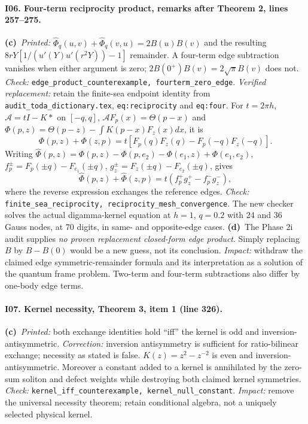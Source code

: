 \documentclass[11pt,a4paper]{article}
\newcommand{\C}{\textbf{(c)}\ }
\newcommand{\D}{\textbf{(d)}\ }
\newcommand{\file}[1]{\nolinkurl{#1}}
\newcommand{\test}[1]{\textit{Check:} \file{#1}.}
\begin{document}
\paragraph{I06. Four-term reciprocity product, remarks after Theorem 2, lines 257--275.}
\C \textit{Printed:}
$\widehat\Phi_q(u,v)+\widehat\Phi_q(v,u)=2B(u)B(v)$ and the resulting
$8rY[1/(u'(Y)u'(r^2Y))-1]$ remainder. A four-term edge subtraction
vanishes when either argument is zero; $2B(0^+)B(v)=2\sqrt\pi B(v)$
does not. \test{edge_product_counterexample, fourterm_zero_edge}
\textit{Verified replacement:} retain the finite-sea endpoint identity
from \file{audit_toda_dictionary.tex}, \file{eq:reciprocity} and \file{eq:four}.
For $t=2\pi h$, $\mathcal A=tI-K*$ on $[-q,q]$,
$\mathcal AF_p(x)=\Theta(p-x)$ and
$\Phi(p,z)=\Theta(p-z)-\int K(p-x)F_z(x)dx$, it is
\[
 \Phi(p,z)+\Phi(z,p)=t[F_p(q)F_z(q)-F_p(-q)F_z(-q)].
\]
Writing $\widehat\Phi(p,z)=\Phi(p,z)-\Phi(p,e_2)-\Phi(e_1,z)+\Phi(e_1,e_2)$,
$f_p^\pm=F_p(\pm q)-F_{e_1}(\pm q)$,
$g_z^\pm=F_z(\pm q)-F_{e_2}(\pm q)$, gives
\[
 \widehat\Phi(p,z)+\widehat\Phi(z,p)=t(f_p^+g_z^+-f_p^-g_z^-),
\]
where the reverse expression exchanges the reference edges.
\test{finite_sea_reciprocity, reciprocity_mesh_convergence}
The new checker solves the actual digamma-kernel equation at $h=1$, $q=0.2$
with 24 and 36 Gauss nodes, at 70 digits, in same- and opposite-edge cases.
\D The Phase 2i audit supplies \emph{no proven replacement closed-form edge
product}. Simply replacing $B$ by $B-B(0)$ would be a new guess, not its
conclusion. \textit{Impact:} withdraw the claimed edge symmetric-remainder
formula and its interpretation as a solution of the quantum frame problem.
Two-term and four-term subtractions also differ by one-body edge terms.

\paragraph{I07. Kernel necessity, Theorem 3, item 1 (line 326).}
\C \textit{Printed:} both exchange identities hold ``iff'' the kernel is
odd and inversion-antisymmetric. \textit{Correction:} inversion
antisymmetry is sufficient for ratio-bilinear exchange; necessity as stated
is false. $K(z)=z^2-z^{-2}$ is even and inversion-antisymmetric.
Moreover a constant added to a kernel is annihilated by the zero-sum soliton
and defect weights while destroying both claimed kernel symmetries.
\test{kernel_iff_counterexample, kernel_null_constant}
\textit{Impact:} remove the universal necessity theorem; retain conditional
algebra, not a uniquely selected physical kernel.
\end{document}
